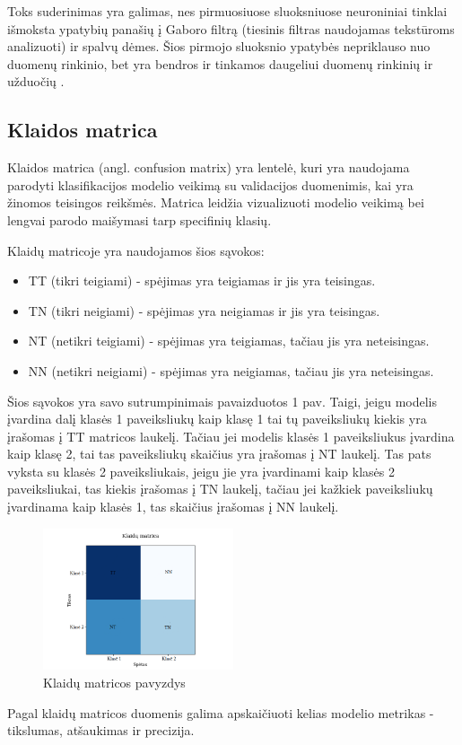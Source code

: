 \documentclass{VUMIFPSbakalaurinis}
\begin{document}
Toks suderinimas yra galimas, nes pirmuosiuose sluoksniuose neuroniniai tinklai išmoksta ypatybių panašių į Gaboro filtrą 
(tiesinis filtras naudojamas tekstūroms analizuoti) ir spalvų dėmes. Šios pirmojo sluoksnio ypatybės nepriklauso nuo duomenų rinkinio, bet yra bendros ir tinkamos 
daugeliui duomenų rinkinių ir užduočių \cite{DBLP:journals/corr/YosinskiCBL14}.

\subsection{Klaidos matrica}
Klaidos matrica (angl. confusion matrix) yra lentelė, kuri yra naudojama parodyti klasifikacijos modelio veikimą su validacijos duomenimis, kai yra žinomos teisingos reikšmės. Matrica leidžia vizualizuoti modelio veikimą bei lengvai parodo maišymasi tarp specifinių klasių.

Klaidų matricoje yra naudojamos šios sąvokos:
\begin{itemize}
    \item TT (tikri teigiami) - spėjimas yra teigiamas ir jis yra teisingas.
    \item TN (tikri neigiami) - spėjimas yra neigiamas ir jis yra teisingas.
    \item NT (netikri teigiami) - spėjimas yra teigiamas, tačiau jis yra neteisingas.
    \item NN (netikri neigiami) - spėjimas yra neigiamas, tačiau jis yra neteisingas.
\end{itemize}

Šios sąvokos yra savo sutrumpinimais pavaizduotos 1 pav. Taigi, jeigu modelis įvardina dalį klasės 1 paveiksliukų kaip klasę 1 tai tų paveiksliukų kiekis yra įrašomas į TT matricos laukelį. Tačiau jei modelis klasės 1 paveiksliukus įvardina kaip klasę 2, tai tas paveiksliukų skaičius yra įrašomas į NT laukelį. Tas pats vyksta su klasės 2 paveiksliukais, jeigu jie yra įvardinami kaip klasės 2 paveiksliukai, tas kiekis įrašomas į TN laukelį, tačiau jei kažkiek paveiksliukų įvardinama kaip klasės 1, tas skaičius įrašomas į NN laukelį. 
\begin{figure}[H]
    \centering
    \includegraphics[width=0.5\textwidth]{img/KlaiduMatrica.png}
    \caption{Klaidų matricos pavyzdys}
    \label{fig:architecture}
\end{figure}
Pagal klaidų matricos duomenis galima apskaičiuoti kelias modelio metrikas - tikslumas, atšaukimas ir precizija.
\end{document}
